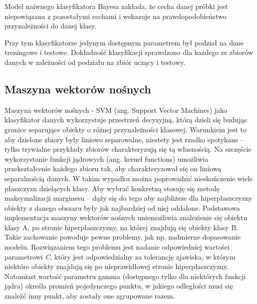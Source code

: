 \documentclass{classrep}
\begin{document}
{{            Model naiwnego klasyfikatora Bayesa zakłada, że cecha danej próbki jest
            niepowiązana z pozostałymi cechami i wskazuje na prawdopodobieństwo
            przynależności do danej klasy.
            
            Przy tym klasyfikatorze jedynym dostępnym parametrem był podział na dane
            treningowe i testowe. Dokładność klasyfikacji sprawdzono dla każdego ze zbiorów danych w
            zależności od podziału na zbiór uczący i testowy.
        }

        \subsection{Maszyna wektorów nośnych}
        \label{svm_intro} {
            Maszyna wektorów nośnych - SVM (ang. Support Vector Machines) jako
            klasyfikator danych wykorzystuje przestrzeń decyzyjną, którą dzieli się
            budując granice separujące obiekty o różnej przynależności klasowej.
            Warunkiem jest to aby dzielone zbiory były liniowo separowalne, niestety
            jest rzadko spotykane -- tylko trywialne przykłady zbiorów charakteryzują
            się tą własnością. Na szczęście wykorzystanie funkcji jądrowych (ang.
            kernel functions) umożliwia przekształcenie każdego zbioru tak, aby
            charakteryzował się on liniową separalnością danych. W takim wypadku można
            poprowadzić nieskończenie wiele płaszczyzn dzielących klasy. Aby wybrać
            konkretną stosuję się metodę maksymalizacji marginesu -- dąży się do tego
            aby najbliższe dla hiperpłaszczyzny obiekty z danego obszaru były jak
            najbardziej od niej oddalone. Podstawowa implementacja maszyny wektorów
            nośnych uniemożliwia znalezienie się obiektu klasy A, po stronie
            hiperpłaszczyzny, na której znajdują się obiekty klasy B. Takie zachowanie
            powoduje pewne problemy, jak np. nadmierne dopasowanie modelu. Rozwiązaniem
            tego problemu jest nadanie odpowiedniej wartości parametrowi \emph{C},
            który jest odpowiedzialny za tolerancję zjawiska, w którym niektóre obiekty
            znajdują się po nieprawidłowej stronie hiperpłaszczyzny. Natomiast wartość
            parametru gamma (dostępnego tylko dla niektórych funkcji jądra) określa
            promień pojedynczego punktu, w jakiego odległości musi się znaleźć inny
            punkt, aby zostały one zgrupowane razem.
        }

}
\end{document}
